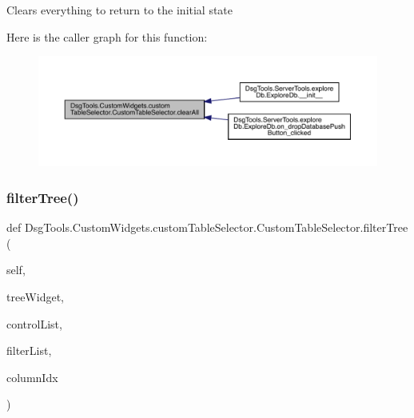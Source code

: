\begin{DoxyVerb}Clears everything to return to the initial state
\end{DoxyVerb}
 Here is the caller graph for this function\+:
\nopagebreak
\begin{figure}[H]
\begin{center}
\leavevmode
\includegraphics[width=350pt]{class_dsg_tools_1_1_custom_widgets_1_1custom_table_selector_1_1_custom_table_selector_a2b433744fb735a74d20fb729bf188f6d_icgraph}
\end{center}
\end{figure}
\mbox{\label{class_dsg_tools_1_1_custom_widgets_1_1custom_table_selector_1_1_custom_table_selector_af58cd7feefe930b6bb5a2e669e79c6a3}} 
\subsubsection{\texorpdfstring{filter\+Tree()}{filterTree()}}
{\footnotesize\ttfamily def Dsg\+Tools.\+Custom\+Widgets.\+custom\+Table\+Selector.\+Custom\+Table\+Selector.\+filter\+Tree (\begin{DoxyParamCaption}\item[{}]{self,  }\item[{}]{tree\+Widget,  }\item[{}]{control\+List,  }\item[{}]{filter\+List,  }\item[{}]{column\+Idx }\end{DoxyParamCaption})}

